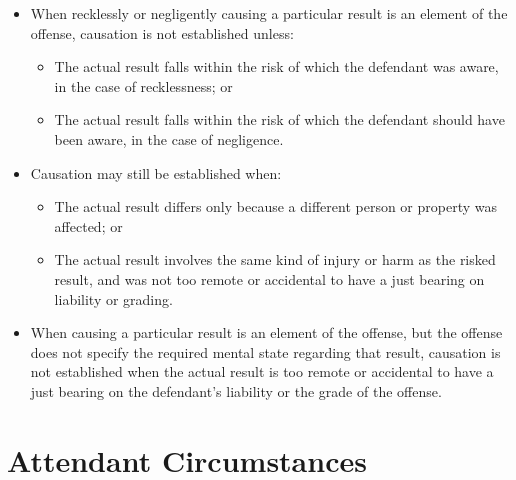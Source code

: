 \documentclass[11pt]{tex/lawoutline}
\begin{document}
{
\begin{itemize}
    \item When recklessly or negligently causing a particular result is an element of the offense, causation is not established unless:
    \begin{itemize}
        \item The actual result falls within the risk of which the defendant was aware, in the case of recklessness; or
        \item The actual result falls within the risk of which the defendant should have been aware, in the case of negligence.
    \end{itemize}
    \item Causation may still be established when:
    \begin{itemize}
        \item The actual result differs only because a different person or property was affected; or
        \item The actual result involves the same kind of injury or harm as the risked result, and was not too remote or accidental to have a just bearing on liability or grading.
    \end{itemize}
\end{itemize}
}

{
\begin{itemize}
    \item When causing a particular result is an element of the offense, but the offense does not specify the required mental state regarding that result, causation is not established when the actual result is too remote or accidental to have a just bearing on the defendant's liability or the grade of the offense.
\end{itemize}
}


\section{Attendant Circumstances}
\end{document}
